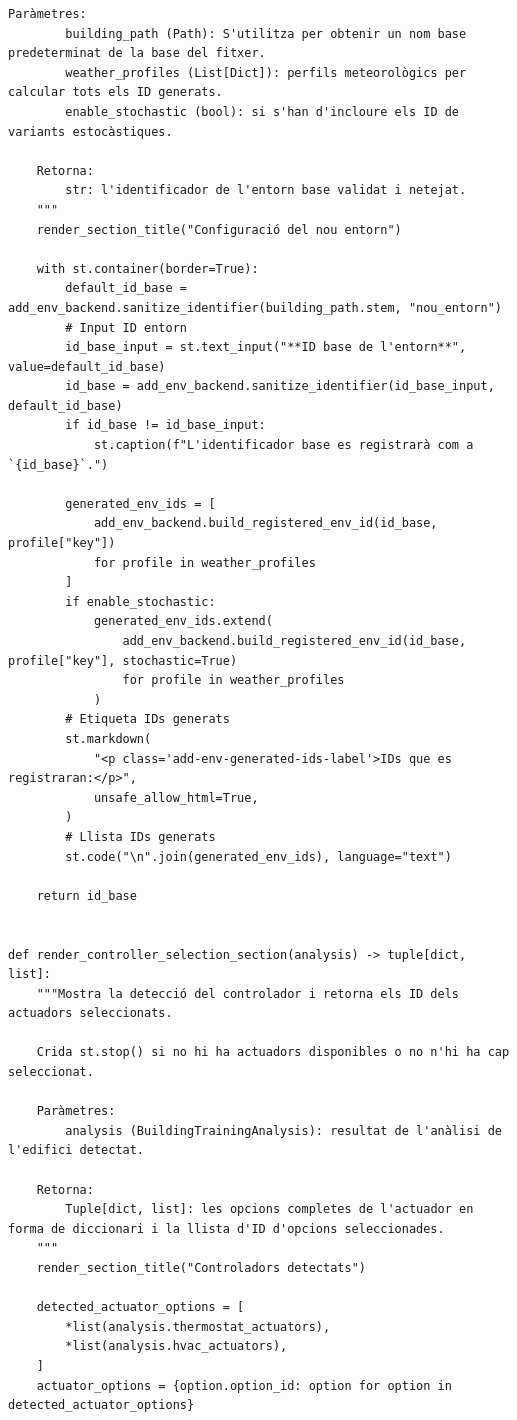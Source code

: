 \documentclass[10pt,a4paper]{article}
\begin{document}
\begin{lstlisting}[style=studioPython,caption={pages/Afegir\_Entorn.py},label={lst:pages-afegir-entorn-py}]
    Paràmetres:
        building_path (Path): S'utilitza per obtenir un nom base predeterminat de la base del fitxer.
        weather_profiles (List[Dict]): perfils meteorològics per calcular tots els ID generats.
        enable_stochastic (bool): si s'han d'incloure els ID de variants estocàstiques.

    Retorna:
        str: l'identificador de l'entorn base validat i netejat.
    """
    render_section_title("Configuració del nou entorn")

    with st.container(border=True):
        default_id_base = add_env_backend.sanitize_identifier(building_path.stem, "nou_entorn")
        # Input ID entorn
        id_base_input = st.text_input("**ID base de l'entorn**", value=default_id_base)
        id_base = add_env_backend.sanitize_identifier(id_base_input, default_id_base)
        if id_base != id_base_input:
            st.caption(f"L'identificador base es registrarà com a `{id_base}`.")

        generated_env_ids = [
            add_env_backend.build_registered_env_id(id_base, profile["key"])
            for profile in weather_profiles
        ]
        if enable_stochastic:
            generated_env_ids.extend(
                add_env_backend.build_registered_env_id(id_base, profile["key"], stochastic=True)
                for profile in weather_profiles
            )
        # Etiqueta IDs generats
        st.markdown(
            "<p class='add-env-generated-ids-label'>IDs que es registraran:</p>",
            unsafe_allow_html=True,
        )
        # Llista IDs generats
        st.code("\n".join(generated_env_ids), language="text")

    return id_base


def render_controller_selection_section(analysis) -> tuple[dict, list]:
    """Mostra la detecció del controlador i retorna els ID dels actuadors seleccionats.

    Crida st.stop() si no hi ha actuadors disponibles o no n'hi ha cap seleccionat.

    Paràmetres:
        analysis (BuildingTrainingAnalysis): resultat de l'anàlisi de l'edifici detectat.

    Retorna:
        Tuple[dict, list]: les opcions completes de l'actuador en forma de diccionari i la llista d'ID d'opcions seleccionades.
    """
    render_section_title("Controladors detectats")

    detected_actuator_options = [
        *list(analysis.thermostat_actuators),
        *list(analysis.hvac_actuators),
    ]
    actuator_options = {option.option_id: option for option in detected_actuator_options}


\end{lstlisting}
\end{document}
